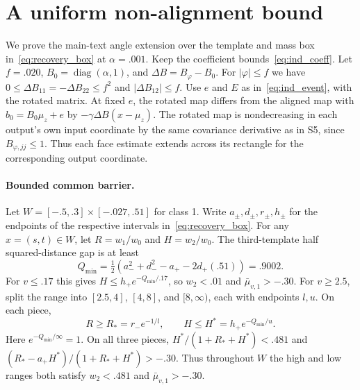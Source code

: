 \section{A uniform non-alignment bound}\label{sec:rotation_proof}
We prove the main-text angle extension over the template and mass
box in~\eqref{eq:recovery_box} at $\alpha=.001$.
Keep the coefficient bounds~\eqref{eq:ind_coeff}. Let $f=.020$,
$B_0=\operatorname{diag}(\alpha,1)$, and
$\Delta B=B_\varphi-B_0$. For $|\varphi|\le f$ we have
$0\le\Delta B_{11}=-\Delta B_{22}\le f^2$ and
$|\Delta B_{12}|\le f$. Use $e$ and $E$ as in~\eqref{eq:ind_event},
with the rotated matrix. At fixed $e$, the rotated map differs
from the aligned map with $b_0=B_0\mu_z+e$ by
$-\gamma\Delta B(x-\mu_z)$.
The rotated map is nondecreasing in each output's own input
coordinate by the same covariance derivative as in S5, since
$B_{\varphi,jj}\le1$. Thus each face estimate extends across its
rectangle for the corresponding output coordinate.

\paragraph{Bounded common barrier.}
Let $W=[-.5,.3]\times[-.027,.51]$ for class 1.
Write $a_\pm,d_\pm,r_\pm,h_\pm$ for the endpoints of the
respective intervals in~\eqref{eq:recovery_box}.
For any $x=(s,t)\in W$, let $R=w_1/w_0$ and $H=w_2/w_0$.
The third-template half squared-distance gap is at least
\[
 Q_{\min}
 =\tfrac12(a_-^2+d_-^2-a_+-2d_+(.51))=.9002 .
\]
For $v\le.17$ this gives $H\le h_+e^{-Q_{\min}/.17}$,
so $w_2<.01$ and $\bar\mu_{v,1}>-.30$.
For $v\ge2.5$, split the range into $[2.5,4]$, $[4,8]$, and
$[8,\infty)$, each with endpoints $l,u$. On each piece,
\[
 R\ge R_* =r_-e^{-1/l},\qquad H\le H^*=h_+e^{-Q_{\min}/u}.
\]
Here $e^{-Q_{\min}/\infty}=1$. On all three pieces,
$H^*/(1+R_*+H^*)<.481$ and
$(R_*-a_+H^*)/(1+R_*+H^*)>-.30$.
Thus throughout $W$ the high and low ranges both satisfy
$w_2<.481$ and $\bar\mu_{v,1}>-.30$.

